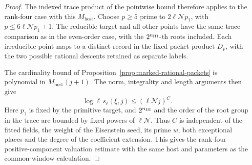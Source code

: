 \begin{proof}

The indexed trace product of the pointwise bound
therefore applies to the rank-four case with this \(M_{\mathrm{host}}\).
Choose \(p\geq5\) prime to \(2\ell\mathcal Np_1\),
with \(p\leq6\ell\mathcal Np_1+1\).
The reducible target and all other points have the
same trace comparison as in the even-order case, with the
\(2^{n_{\rm III}}\)-th roots included.
Each irreducible point maps to a distinct record in the fixed
packet product \(D_p\), with the two possible rational descents
retained as separate labels.

The cardinality bound of
Proposition~\ref{prop:marked-rational-packets} is polynomial in
\(M_{\mathrm{host}}(j+1)\).
The norm, integrality and length arguments then give
\[
      \log\ell\,s_\ell(\xi,j)\leq(\ell\mathcal N j)^C .
\]
Here \(p_1\) is fixed by the primitive target, and
\(2^{n_{\rm III}}\) and the order of the root group
in the trace are bounded by fixed powers of
\(\ell\mathcal N\). Thus \(C\) is independent of the
fitted fields, the weight of the Eisenstein seed, its
prime \(w\), both exceptional places and the degree of
the coefficient extension. This gives the rank-four positive-component valuation estimate with the same host and
parameters as the common-window calculation.
\end{proof}
